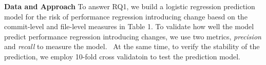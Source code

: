 

\noindent \textbf{Data and Approach}
To answer RQ1, we build a logistic regression prediction model for the risk of performance regression introducing change baesd on the commit-level and file-level measures in Table 1. To validate how well the model predict performance regression introducing changes, we use two metrics, \emph{precision} and \emph{recall} to measure the model.  At the same time, to verify the stability of the prediction, we employ 10-fold cross validatoin to test the prediction model.





